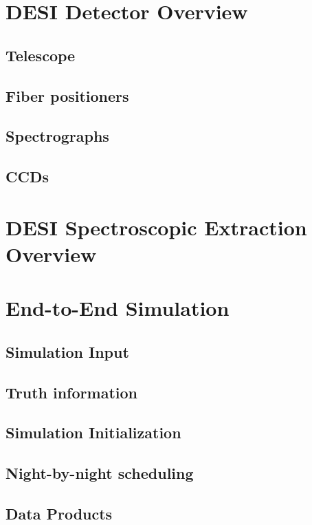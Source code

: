 \documentclass[12pt]{article}
\begin{document}
\section{DESI Detector Overview}

\subsection{Telescope}
\subsection{Fiber positioners}
\subsection{Spectrographs}
\subsection{CCDs}

\section{DESI Spectroscopic Extraction Overview}

\section{End-to-End Simulation}

\subsection{Simulation Input}

\subsection{Truth information}

\subsection{Simulation Initialization}

\subsection{Night-by-night scheduling}

\subsection{Data Products}
\end{document}
